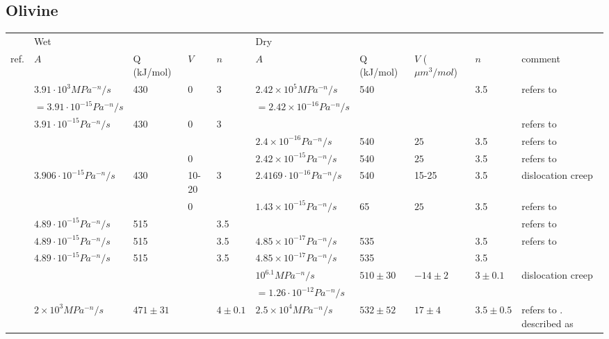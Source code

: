 
\subsection{Olivine}

\begin{tabular}{|l|llll|llll|p{4cm}|}
\hline
         & Wet                   &            &        &       & Dry           &           &        &     &\\
ref.     & $A$        & Q (kJ/mol) & $V$& $n$   & $A$ & Q (kJ/mol) & $V$ ($\mu m^3/mol$) & $n$ & comment\\
\hline\hline
\cite{gumb08} & $3.91\cdot 10^{3}MPa^{-n}/s$  & 430        &  0      & 3     & $2.42\times 10^5MPa^{-n}/s$  & 540    &        & 3.5    & refers to \cite{kawu93}\\
              & $=3.91\cdot 10^{-15}Pa^{-n}/s$ &&&&                            $=2.42\times 10^{-16}Pa^{-n}/s$  &&& \\ 
\cite{cube11} & $3.91\cdot 10^{-15}Pa^{-n}/s$ & 430        &  0      & 3     & &&&           & refers to \cite{kawu93}\\
\cite{hube03} &                   &            &      &        & $2.4\times10^{-16}Pa^{-n}/s$ & 540 & $25$& 3.5 & refers to \cite{kawu93} \\
\cite{hube07} &                       &            &     0   &       & $2.42\times10^{-15}Pa^{-n}/s$  & 540 & $25$& 3.5 & refers to \cite{kawu93} \\
\cite{kawu93} & $3.906\cdot10^{-15}Pa^{-n}/s$& 430 & 10-20 & 3 &$2.4169\cdot10^{-16}Pa^{-n}/s$ & 540 & 15-25 & 3.5 & dislocation creep\\
\hline
\cite{jahu12} &                       &            &     0   &       & $1.43\times10^{-15}Pa^{-n}/s$  & 65  & $25$& 3.5 & refers to \cite{kawu93} \\
\cite{grpy12} & $4.89\cdot10^{-15}Pa^{-n}/s$ & 515 & & 3.5 &&&&& refers to \cite{hiko96} \\
\cite{pybf02} & $4.89\cdot10^{-15}Pa^{-n}/s$ & 515 & & 3.5 & $4.85\times10^{-17}Pa^{-n}/s$ & 535 & & 3.5& refers to \cite{hiko96} \\
\cite{hiko96} & $4.89\cdot10^{-15}Pa^{-n}/s$ & 515 & & 3.5 &  $4.85\times10^{-17}Pa^{-n}/s$ & 535 & & 3.5& \\
\cite{kaju03} &    &&&& $10^{6.1}MPa^{-n}/s$  & $510\pm30$  & $-14\pm2$& $3\pm0.1$& dislocation creep \\
              &    &&&& $=1.26\cdot10^{-12}Pa^{-n}/s$ &&&&\\
\cite{ranalli} &   $2\times10^3 MPa^{-n}/s$ & $471\pm31$ &  & $4\pm0.1$ & $2.5\times10^4 MPa^{-n}/s$ & $532\pm52$ & $17\pm4$  & $3.5\pm0.5$ & refers to \cite{kikr87}. described as 

\end{tabular}

